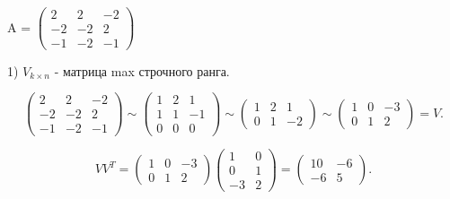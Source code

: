 \begin{example}~
    
    A = $\left(\begin{array}{ccc}
        2 & 2 & -2 \\
        -2 & -2 & 2 \\
        -1 & -2 & -1
    \end{array}\right)$

    1) $V_{k \times n}$ - матрица max строчного ранга.
    
    \begin{equation*}
        \left(\begin{array}{ccc}
            2 & 2 & -2 \\
            -2 & -2 & 2 \\
            -1 & -2 & -1
        \end{array}\right)
        \sim 
        \left(\begin{array}{ccc}
            1 & 2 & 1 \\
            1 & 1 & -1 \\
            0 & 0 & 0
        \end{array}\right)
        \sim 
        \left(\begin{array}{ccc}
            1 & 2 & 1 \\
            0 & 1 & -2
        \end{array}\right)
        \sim 
        \left(\begin{array}{ccc}
            1 & 0 & -3 \\
            0 & 1 & 2
        \end{array}\right) = V
    .\end{equation*}

    \begin{equation*}
        VV^T = \left(\begin{array}{ccc}
            1 & 0 & -3 \\
            0 & 1 & 2
        \end{array}\right)
        \left(\begin{array}{cc}
            1 & 0 \\
            0 & 1 \\
            -3 & 2
        \end{array}\right)
        =
        \left(\begin{array}{cc}
            10 & -6 \\
            -6 & 5
        \end{array}\right)
    .\end{equation*}


\end{example}
